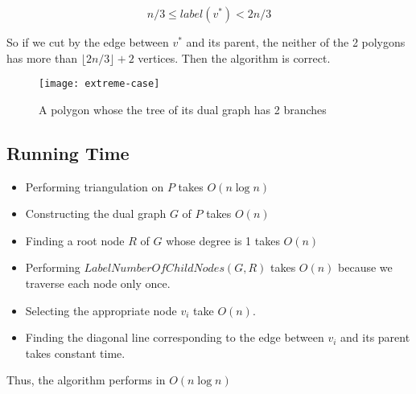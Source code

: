 $$n/3 \leq label(v^*) < 2n/3$$

So if we cut by the edge between $v^*$ and its parent, the neither of the 2 polygons has more than $\lfloor2n/3\rfloor + 2$ vertices.
Then the algorithm is correct. \\

\begin{center}
    \label{figure1}
    \begin{figure}[h]
    \centering
    \texttt{[image: extreme-case]}\\
    \caption{A polygon whose the tree of its dual graph has 2 branches} \label{fig:extremecase}
    \end{figure}
\end{center}


\subsection*{Running Time}
\begin{itemize}
    \item Performing triangulation on $P$ takes $O(n\log{n})$
    \item Constructing the dual graph $G$ of $P$ takes $O(n)$
    \item Finding a root node $R$ of $G$ whose degree is 1 takes $O(n)$
    \item Performing $LabelNumberOfChildNodes(G,R)$ takes $O(n)$ because we traverse each node only once.
    \item Selecting the appropriate node $v_i$ take $O(n)$.
    \item Finding the diagonal line corresponding to the edge between $v_i$ and its parent takes constant time.
\end{itemize}

Thus, the algorithm performs in $O(n\log{n})$
